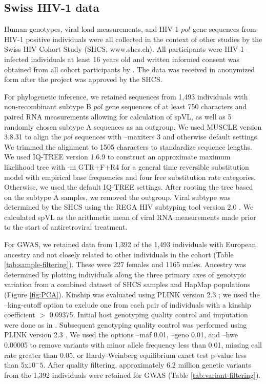 \documentclass[]{article}
\begin{document}
\begin{doublespace}
\subsection{Swiss HIV-1 data}

Human genotypes, viral load measurements, and HIV-1 $pol$ gene sequences from HIV-1 positive individuals were all collected in the context of other studies by the Swiss HIV Cohort Study (SHCS, www.shcs.ch). All participants were HIV-1–infected individuals at least 16 years old and written informed consent was obtained from all cohort participants by \citet{Schoeni-Affolter2010}. The data was received in anonymized form after the project was approved by the SHCS. 

For phylogenetic inference, we retained sequences from 1,493 individuals with non-recombinant subtype B $pol$ gene sequences of at least 750 characters and paired RNA measurements allowing for calculation of spVL, as well as 5 randomly chosen subtype A sequences as an outgroup. We used MUSCLE version 3.8.31 \citep{edgar_muscle:_2004} to align the $pol$ sequences with --maxiters 3 and otherwise default settings. We trimmed the alignment to 1505 characters to standardize sequence lengths. We used IQ-TREE version 1.6.9 to construct an approximate maximum likelihood tree with -m GTR+F+R4 for a general time reversible substitution model with empirical base frequencies and four free substitution rate categories. Otherwise, we used the default IQ-TREE settings. After rooting the tree based on the subtype A samples, we removed the outgroup. Viral subtype was determined by the SHCS using the REGA HIV subtyping tool version 2.0 \citep{DeOliveira2005}. We calculated spVL as the arithmetic mean of viral RNA measurements made prior to the start of antiretroviral treatment. 

For GWAS, we retained data from 1,392 of the 1,493 individuals with European ancestry and not closely related to other individuals in the cohort (Table \ref{tab:sample-filtering}). These were 227 females and 1165 males. Ancestry was determined by plotting individuals along the three primary axes of genotypic variation from a combined dataset of SHCS samples and HapMap populations (Figure \ref{fig:PCA}). Kinship was evaluated using PLINK version 2.3 \citep{Chang2015}; we used the --king-cutoff option to exclude one from each pair of individuals with a kinship coefficient $>$ 0.09375. Initial host genotyping quality control and imputation were done as in \cite{Thorball2021GeneticLymphoma}. Subsequent genotyping quality control was performed using PLINK version 2.3 \citep{Chang2015}. We used the options --maf 0.01, --geno 0.01, and --hwe 0.00005 to remove variants with minor allele frequency less than 0.01, missing call rate greater than 0.05, or Hardy-Weinberg equilibrium exact test p-value less than 5x10$^-5$. After quality filtering, approximately 6.2 million genetic variants from the 1,392 individuals were retained for GWAS (Table \ref{tab:variant-filtering}). 


\end{doublespace}
\end{document}
